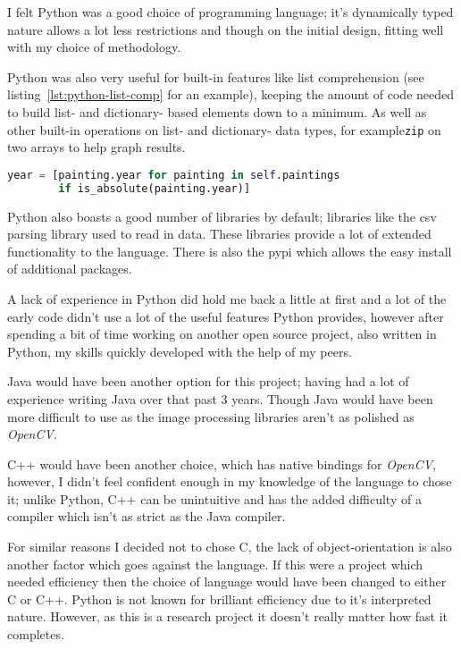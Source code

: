 I felt Python was a good choice of programming language; it's dynamically typed nature allows a
lot less restrictions and though on the initial design, fitting well with my choice of 
methodology. 

Python was also very useful for built-in features like list comprehension (see 
listing~\ref{lst:python-list-comp} for an example), keeping the amount of code needed to build 
list- and dictionary- based elements down to a minimum. As well as other built-in operations on 
list- and dictionary- data types, for example\texttt{zip} on two arrays to help graph results.

\begin{lstlisting}[language=python,
caption={Example of List Comprehension in Python},
label=lst:python-list-comp]
year = [painting.year for painting in self.paintings 
        if is_absolute(painting.year)]
\end{lstlisting}

Python also boasts a good number of libraries by default; libraries like the \gls{csv} parsing 
library used to read in data. These libraries provide a lot of extended functionality to the 
language. There is also the \gls{pypi} which allows the easy install of 
additional packages.

A lack of experience in Python did hold me back a little at first and a lot of the early code 
didn't use a lot of the useful features Python provides, however after spending a bit of time
working on another open source project, also written in Python, my skills quickly developed with
the help of my peers.

Java would have been another option for this project; having had a lot of experience writing Java
over that past 3 years. Though Java would have been more difficult to use as the image processing
libraries aren't as polished as \emph{OpenCV}.

C++ would have been another choice, which has native bindings for \emph{OpenCV}, however, I didn't
feel confident enough in my knowledge of the language to chose it; unlike Python, C++ can be 
unintuitive and has the added difficulty of a compiler which isn't as strict as the Java compiler.

For similar reasons I decided not to chose C, the lack of object-orientation is also another 
factor which goes against the language. If this were a project which needed efficiency then the
choice of language would have been changed to either C or C++. Python is not known for brilliant
efficiency due to it's interpreted nature. However, as this is a research project it doesn't 
really matter how fast it completes.

